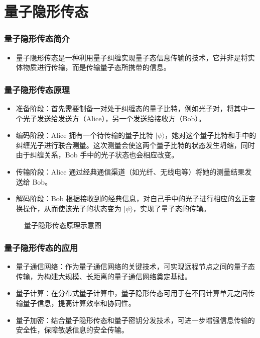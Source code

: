 \section{量子隐形传态}
\begin{frame}
    \frametitle{量子隐形传态简介}
    \begin{itemize}
        \item 量子隐形传态是一种利用量子纠缠实现量子态信息传输的技术，它并非是将实体物质进行传输，而是传输量子态所携带的信息。
    \end{itemize}
\end{frame}

\begin{frame}
    \frametitle{量子隐形传态原理}
    \begin{itemize}
        \item 准备阶段：首先需要制备一对处于纠缠态的量子比特，例如光子对，将其中一个光子发送给发送方（Alice），另一个发送给接收方（Bob）。
        \item 编码阶段：Alice 拥有一个待传输的量子比特 \( |\psi\rangle \)，她对这个量子比特和手中的纠缠光子进行联合测量。这次测量会使这两个量子比特的状态发生坍缩，同时由于纠缠关系，Bob 手中的光子状态也会相应改变。
        \item 传输阶段：Alice 通过经典通信渠道（如光纤、无线电等）将她的测量结果发送给 Bob。
        \item 解码阶段：Bob 根据接收到的经典信息，对自己手中的光子进行相应的幺正变换操作，从而使该光子的状态变为 \( |\psi\rangle \)，实现了量子态的传输。
    \end{itemize}
    \begin{figure}
        \centering
        \caption{量子隐形传态原理示意图}
    \end{figure}
\end{frame}

\begin{frame}
    \frametitle{量子隐形传态的应用}
    \begin{itemize}
        \item 量子通信网络：作为量子通信网络的关键技术，可实现远程节点之间的量子态传输，为构建大规模、长距离的量子通信网络奠定基础。
        \item 量子计算：在分布式量子计算中，量子隐形传态可用于在不同计算单元之间传输量子信息，提高计算效率和协同性。
        \item 量子加密：结合量子隐形传态和量子密钥分发技术，可进一步增强信息传输的安全性，保障敏感信息的安全传输。
    \end{itemize}
\end{frame}

